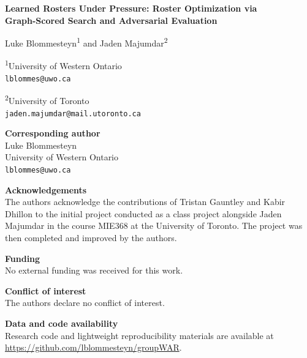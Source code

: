 \documentclass[12pt,letterpaper]{article}
\begin{document}
\begin{center}
{\Large\bfseries Learned Rosters Under Pressure: Roster Optimization via\\
Graph-Scored Search and Adversarial Evaluation}

\vspace{1.5em}

{\large Luke Blommesteyn\textsuperscript{1} and Jaden Majumdar\textsuperscript{2}}

\vspace{1em}

\textsuperscript{1}University of Western Ontario\\
\texttt{lblommes@uwo.ca}

\vspace{0.5em}

\textsuperscript{2}University of Toronto\\
\texttt{jaden.majumdar@mail.utoronto.ca}
\end{center}

\vspace{2em}

\textbf{Corresponding author}\\
Luke Blommesteyn\\
University of Western Ontario\\
\texttt{lblommes@uwo.ca}

\vspace{1.25em}

\textbf{Acknowledgements}\\
The authors acknowledge the contributions of Tristan Gauntley and Kabir
Dhillon to the initial project conducted as a class project alongside
Jaden Majumdar in the course MIE368 at the University of Toronto. The
project was then completed and improved by the authors.

\vspace{1.25em}

\textbf{Funding}\\
No external funding was received for this work.

\vspace{1.25em}

\textbf{Conflict of interest}\\
The authors declare no conflict of interest.

\vspace{1.25em}

\textbf{Data and code availability}\\
Research code and lightweight reproducibility materials are available at
\url{https://github.com/lblommesteyn/groupWAR}.
\end{document}
